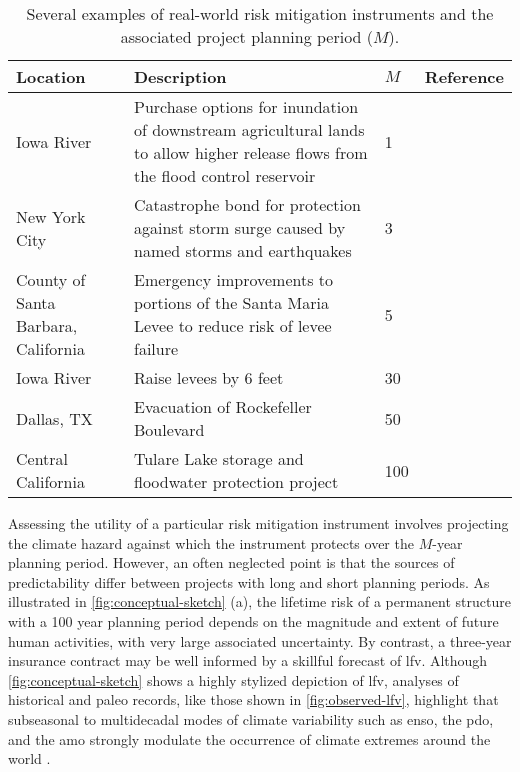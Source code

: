 \documentclass[
]{agujournal2018}
\begin{document}
\noindent\begin{table}
  {\footnotesize
    \begin{tabular}{L{1in}L{2.5in}L{0.3in}L{1.7in}}
      \toprule
      Location & Description & $M$ & Reference \\
      \midrule
      Iowa River & Purchase options for inundation of downstream agricultural lands to allow higher release flows from the flood control reservoir & 1 & \citet{Spence:2016ca} \\
      New York City & Catastrophe bond for protection against storm surge caused by named storms and earthquakes & 3 &  \\
      County of Santa Barbara, California & Emergency improvements to portions of the Santa Maria Levee to reduce risk of levee failure & 5 & \citet{USACE:2007ta} \\
      Iowa River & Raise levees by 6 feet & 30 & \citet{Spence:2016ca} \\
      Dallas, TX & Evacuation of Rockefeller Boulevard & 50 & \citet{USACE:2014vn} \\
      Central California & Tulare Lake storage and floodwater protection project & 100 & \citet{GEI:gIaEZ-gS} \\
      \bottomrule
    \end{tabular}
    \caption{
      Several examples of real-world risk mitigation instruments and the associated project planning period ($M$).
    }\label{tab:real-world-M}
  }
\end{table}

Assessing the utility of a particular risk mitigation instrument involves projecting the climate hazard against which the instrument protects over the $M$-year planning period.
However, an often neglected point is that the sources of predictability differ between projects with long and short planning periods.
As illustrated in \cref{fig:conceptual-sketch} (a), the lifetime risk of a permanent structure with a 100 year planning period depends on the magnitude and extent of future human activities, with very large associated uncertainty.
By contrast, a three-year insurance contract may be well informed by a skillful forecast of \gls{lfv}.
Although \cref{fig:conceptual-sketch} shows a highly stylized depiction of \gls{lfv}, analyses of historical and paleo records, like those shown in \cref{fig:observed-lfv}, highlight that subseasonal to multidecadal modes of climate variability such as \gls{enso}, the \gls{pdo}, and the \gls{amo} strongly modulate the occurrence of climate extremes around the world \citep{Ropelewski:1987do, Cook:2010bz, Swierczynski:2012km, Hodgkins:2017hw, Woollings:2018ea}.
\end{document}
